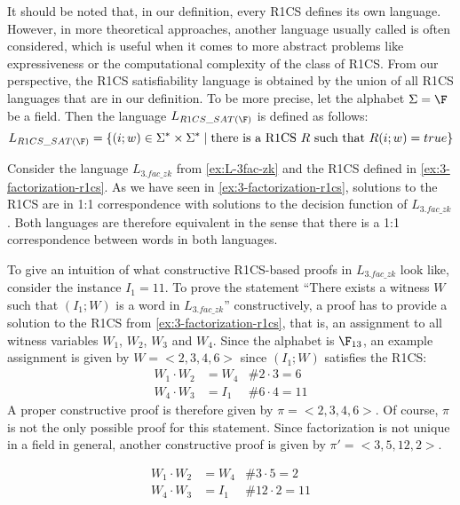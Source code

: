 \begin{remark}[R1CS satisfiability]\label{r1cs-satisfiability}  It should be noted that, in our definition, every R1CS defines its own language. However,  in more theoretical approaches, another language usually called  is often considered, which is useful when it comes to more abstract problems like expressiveness or the computational complexity of the class of  R1CS. From our perspective, the R1CS satisfiability language is obtained by the union of all R1CS languages that are in our definition. To be more precise, let the alphabet $\Sigma=\F$ be a field. Then the language $L_{R1CS\_SAT(\F)}$ is defined as follows:
$$
L_{R1CS\_SAT(\F)} = \{(i;w)\in \Sigma^*\times \Sigma^*\;|\; \text{there is a R1CS $R$ such that } R(i;w)=true  \}
$$
\end{remark}
\begin{example}[3-Factorization]
\label{ex:3-fac-R1CS-constr-proof}
Consider the language $L_{3.fac\_zk}$ from \examplename{} \ref{ex:L-3fac-zk} and the R1CS defined in \examplename{} \ref{ex:3-factorization-r1cs}. As we have seen in \ref{ex:3-factorization-r1cs}, solutions to the R1CS are in 1:1 correspondence with solutions to the decision function of $L_{3.fac\_zk}$. Both languages are therefore equivalent in the sense that there is a 1:1 correspondence between words in both languages.

To give an intuition of what constructive R1CS-based proofs in $L_{3.fac\_zk}$ look like, consider the instance $I_1= 11$. To prove the statement ``There exists a witness $W$ such that $(I_1;W)$ is a word in $L_{3.fac\_zk}$'' constructively, a proof has to provide a solution to the R1CS from \examplename{} \ref{ex:3-factorization-r1cs}, that is, an assignment to all witness variables $W_1$, $W_2$, $W_3$ and $W_4$. Since the alphabet is $\F_{13}$, an example assignment is given by
$W=<2,3,4,6>$ since $(I_1;W)$ satisfies the R1CS:
\begin{align*}
W_1 \cdot W_2 &= W_4 & \text{\# } 2\cdot 3 = 6\\
W_4 \cdot W_3 &= I_1 & \text{\# } 6\cdot 4 = 11
\end{align*}
A proper constructive proof is therefore given by $\pi=<2,3,4,6>$. Of course, $\pi$ is not the only possible proof for this statement. Since factorization is not unique in a field in general, another constructive proof is given by $\pi'=<3,5,12,2>$. 

\begin{align*}
W_1 \cdot W_2 &= W_4 & \text{\# } 3\cdot 5 = 2\\
W_4 \cdot W_3 &= I_1 & \text{\# } 12\cdot 2 = 11
\end{align*}

\end{example}

